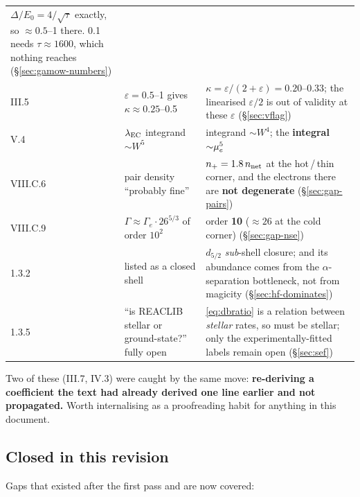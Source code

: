 \begin{center}
\begin{tabularx}{\textwidth}{@{}L{1.6cm} L{4.6cm} Y@{}}
  $\Delta/E_0 = 4/\sqrt\tau$ exactly, so $\approx 0.5$--1 there. 0.1 needs
  $\tau \approx 1600$, which nothing reaches (\S\ref{sec:gamow-numbers}) \\
III.5 & $\varepsilon = 0.5$--1 gives $\kappa \approx 0.25$--0.5 &
  $\kappa = \varepsilon/(2+\varepsilon) = \mathbf{0.20}$--$\mathbf{0.33}$; the
  linearised $\varepsilon/2$ is out of validity at these $\varepsilon$
  (\S\ref{sec:vflag}) \\
V.4 & $\lambda_{\rm EC}$ integrand ${\sim}W^5$ &
  integrand ${\sim}W^4$; the \textbf{integral} ${\sim}\mu_{e}^5$ \\
VIII.C.6 & pair density ``probably fine'' &
  $n_+ = 1.8\,n_{\rm net}$ at the hot\,/\,thin corner, and the electrons there
  are \textbf{not degenerate} (\S\ref{sec:gap-pairs}) \\
VIII.C.9 & $\Gamma \approx \Gamma_e\cdot26^{5/3}$ of order $10^2$ &
  order \textbf{10} ($\approx 26$ at the cold corner) (\S\ref{sec:gap-nse}) \\
1.3.2 &  listed as a closed shell &
  $d_{5/2}$ \emph{sub}-shell closure; and its abundance comes from the
  $\alpha$-separation bottleneck, not from magicity
  (\S\ref{sec:hf-dominates}) \\
1.3.5 & ``is REACLIB stellar or ground-state?'' fully open &
  \eqref{eq:dbratio} is a relation between \emph{stellar} rates, so
   must be stellar; only the experimentally-fitted labels remain
  open (\S\ref{sec:sef}) \\
\bottomrule
\end{tabularx}
\end{center}

Two of these (III.7, IV.3) were caught by the same move: \textbf{re-deriving a
coefficient the text had already derived one line earlier and not propagated.}
Worth internalising as a proofreading habit for anything in this document.

\subsection{Closed in this revision}
\label{sec:closed}

Gaps that existed after the first pass and are now covered:

